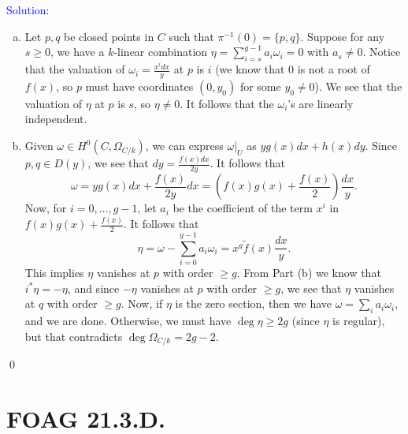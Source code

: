 \documentclass[11pt]{article}
\newenvironment{solution}{\begin{trivlist}\item[]{\textcolor{blue}{Solution:}}}{\qed \end{trivlist}}
\begin{document}
\begin{solution}
\begin{enumerate}[(a)]
        \item Let $p, q$ be closed points in $C$ such that $\pi^{-1}(0) = \{p, q\}$. Suppose for any $s \geq 0$, we have a $k$-linear combination $\eta = \sum_{i=s}^{g-1} a_i \omega_i = 0$ with $a_s \neq 0$. Notice that the valuation of $\omega_i = \frac{x^i dx}{y}$ at $p$ is $i$ (we know that $0$ is not a root of $f(x)$, so $p$ must have coordinates $(0, y_0)$ for some $y_0 \neq 0$). We see that the valuation of $\eta$ at $p$ is $s$, so $\eta \neq 0$. It follows that the $\omega_i$'s are linearly independent. 
        
        \item Given $\omega \in H^0(C, \Omega_{C/k})$, we can express $\omega|_U$ as $yg(x) dx + h(x) dy$. Since $p,q \in D(y)$, we see that $dy = \frac{f(x)dx}{2y}$. It follows that 
        \[
            \omega = y g(x) dx + \frac{f(x)}{2y} dx 
            = \left( f(x)g(x) + \frac{f(x)}{2} \right) \frac{dx}{y}.
        \]
        Now, for $i = 0, \ldots, g-1$, let $a_i$ be the coefficient of the term $x^i$ in $f(x)g(x) + \frac{f(x)}{2}$. It follows that 
        \[
            \eta = \omega - \sum_{i=0}^{g-1} a_i \omega_i 
            = x^g \tilde f(x) \frac{dx}{y}.
        \]
        This implies $\eta$ vanishes at $p$ with order $\geq g$. From Part (b) we know that $i^*\eta = -\eta$, and since $-\eta$ vanishes at $p$ with order $\geq g$, we see that $\eta$ vanishes at $q$ with order $\geq g$. Now, if $\eta$ is the zero section, then we have $\omega = \sum_i a_i \omega_i$, and we are done. Otherwise, we must have $\deg \eta \geq 2g$ (since $\eta$ is regular), but that contradicts $\deg \Omega_{C/k} = 2g - 2$. 
    \end{enumerate}
\end{solution}

\newpage

\section*{FOAG 21.3.D.}
\end{document}
